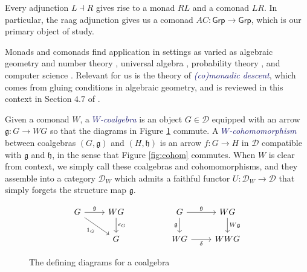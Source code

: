 \documentclass[microtype]{gtpart}
\theoremstyle{definition}
\theoremstyle{theorem}
\newcommand*{\catFont}[1]{\mathsf{#1}}
\newcommand*{\catVarFont}[1]{\mathcal{#1}}
\newcommand{\Grp}{\catFont{Grp}}
\newcommand{\catD}{\catVarFont{D}}
\newcommand*{\important}[1]{\textcolor{MidnightBlue}{\emph{#1}}}
\begin{document}
Every adjunction $L \dashv R$ gives rise to a monad $RL$ and a comonad 
$LR$. In particular, the raag adjunction gives us a comonad 
$AC : \Grp \to \Grp$, which is our primary object of study.

Monads and comonads find application in settings as varied as algebraic 
geometry and number theory
\cite{grothendieckTechniqueDescenteTheoremes1958, 
borceuxCategoriesStructures1994,
borceuxMonadicApproachGalois2010},
universal algebra 
\cite{borceuxCategoriesStructures1994,
adamekAlgebraicTheoriesCategorical2011,
bojanczykRecognisableLanguagesMonads2015,
awodeyCoalgebraicDualBirkhoff2000,
hylandCategoryTheoreticUnderstanding2007},
probability theory 
\cite{giryCategoricalApproachProbability1982,
culbertsonCategoricalFoundationBayesian2014,
leinsterCODENSITYULTRAFILTERMONAD2013},
and computer science 
\cite{moggiNotionsComputationMonads1991,
depaivaDialecticaComonads2021,
ghaniAlgebrasCoalgebrasMonads2001,
ruttenUniversalCoalgebraTheory2000}.
Relevant for us is the theory of \important{(co)monadic descent}, 
which comes from gluing conditions in algebraic geometry, 
and is reviewed in this context in Section $4.7$ of 
\cite{borceuxCategoriesStructures1994}.

Given a comonad $W$, a \important{$W$-coalgebra} is an object
$G \in \catD$ equipped with an arrow $\mathfrak{g} : G \to WG$ so that the
diagrams in Figure \ref{fig:coalg} commute. A \important{$W$-cohomomorphism}
between coalgebras $(G,\mathfrak{g})$ and $(H,\mathfrak{h})$ is an arrow $f : G \to H$
in $\mathcal{D}$ compatible with $\mathfrak{g}$ and $\mathfrak{h}$, in the sense that 
Figure \ref{fig:cohom} commutes. When $W$ is clear from context, we simply call these
coalgebras and cohomomorphisms, and they assemble into a category $\catD_W$
which admits a faithful functor $U : \catD_W \to \catD$ that 
simply forgets the structure map $\mathfrak{g}$.

\setlength\mathsurround{0pt}
\begin{figure}
    \[
        \begin{tikzcd}
        G & WG && G & WG \\
        & G && WG & WWG
        \arrow["\mathfrak{g}", from=1-1, to=1-2]
        \arrow["{\epsilon_G}", from=1-2, to=2-2]
        \arrow["{1_G}"', from=1-1, to=2-2]
        \arrow["\mathfrak{g}"', from=1-4, to=2-4]
        \arrow["\mathfrak{g}", from=1-4, to=1-5]
        \arrow["\delta"', from=2-4, to=2-5]
        \arrow["W\mathfrak{g}", from=1-5, to=2-5]
        \end{tikzcd}
    \]
    \caption{The defining diagrams for a coalgebra}
    \label{fig:coalg}
\end{figure}
\end{document}

